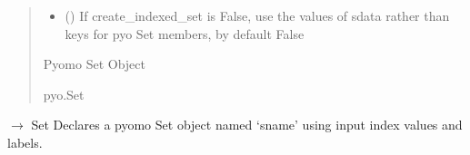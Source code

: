 \documentclass[letterpaper,10pt,english]{sphinxmanual}
\begin{document}
\begin{fulllineitems}
\begin{fulllineitems}
\begin{quote}
\begin{description}
\begin{itemize}
\item {} 
\sphinxAtStartPar
{} (\sphinxstyleliteralemphasis{\sphinxupquote{ | }}\sphinxstyleliteralemphasis{\sphinxupquote{, }}) \textendash{} If create\_indexed\_set is False, use the values of sdata rather than keys for pyo Set members, by default False

\end{itemize}

\sphinxAtStartPar
Pyomo Set Object

\sphinxAtStartPar
pyo.Set

\end{description}\end{quote}

\end{fulllineitems}


\begin{fulllineitems}
\label{\detokenize{src.common.model:src.common.model.Model._declare_set_with_iterable}}
\pysigstartsignatures
\pysiglinewithargsret
{}
{\sphinxparamcomma {}\sphinxparamcomma {}\sphinxparamcomma {}\sphinxparamcomma {}}
{{ $\rightarrow$ Set}}
\pysigstopsignatures
\sphinxAtStartPar
Declares a pyomo Set object named ‘sname’ using input index values and labels.


\end{fulllineitems}
\end{fulllineitems}
\end{document}
